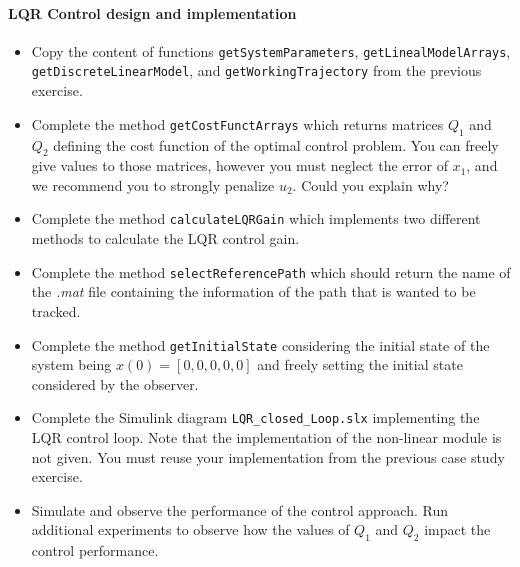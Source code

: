 	\paragraph{LQR Control design and implementation}
	\begin{itemize}
		\item Copy the content of functions \texttt{getSystemParameters}, \texttt{getLinealModelArrays}, \newline\texttt{getDiscreteLinearModel}, and \texttt{getWorkingTrajectory} from the previous exercise. 
		\item Complete the method \texttt{getCostFunctArrays} which returns matrices $Q_1$ and $Q_2$ defining the cost function of the optimal control problem.
		You can freely give values to those matrices, however you must neglect the error of $x_1$, and we recommend you to strongly penalize $u_2$.
		Could you explain why?
		\item Complete the method \texttt{calculateLQRGain} which implements two different methods to calculate the LQR control gain.
		\item Complete the method \texttt{selectReferencePath} which should return the name of the \emph{.mat} file containing the information of the path that is wanted to be tracked.
		\item Complete the method \texttt{getInitialState} considering the initial state of the system being $x(0) = \left[0,0,0,0,0\right]$ and freely setting the initial state considered by the observer.
		\item Complete the Simulink diagram \texttt{LQR\_closed\_Loop.slx} implementing the LQR control loop. 
		Note that the implementation of the non-linear module is not given. You must reuse your implementation from the previous case study exercise. 
		\item Simulate and observe the performance of the control approach.
		Run additional experiments to observe how the values of %
		$Q_1$ %
		and %
		$Q_2$ %
		impact the control performance.
	\end{itemize}
